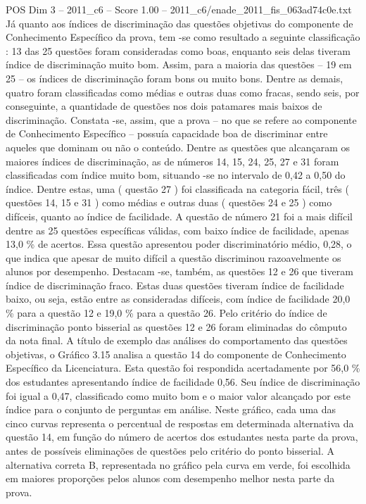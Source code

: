 \begin{textsample}{POS Dim 3 – 2011\_c6 – Score 1.00 – 2011\_c6/enade\_2011\_fis\_063ad74c0e.txt}
Já quanto aos índices de discriminação das questões objetivas do componente de Conhecimento Específico da prova, tem -se como resultado a seguinte classificação : 13 das 25 questões foram consideradas como boas, enquanto seis delas tiveram índice de discriminação muito bom.
Assim, para a maioria das questões – 19 em 25 – os índices de discriminação foram bons ou muito bons.
Dentre as demais, quatro foram classificadas como médias e outras duas como fracas, sendo seis, por conseguinte, a quantidade de questões nos dois patamares mais baixos de discriminação.
Constata -se, assim, que a prova – no que se refere ao componente de Conhecimento Específico – possuía capacidade boa de discriminar entre aqueles que dominam ou não o conteúdo.
Dentre as questões que alcançaram os maiores índices de discriminação, as de números 14, 15, 24, 25, 27 e 31 foram classificadas com índice muito bom, situando -se no intervalo de 0,42 a 0,50 do índice.
Dentre estas, uma ( questão 27 ) foi classificada na categoria fácil, três ( questões 14, 15 e 31 ) como médias e outras duas ( questões 24 e 25 ) como difíceis, quanto ao índice de facilidade.
A questão de número 21 foi a mais difícil dentre as 25 questões específicas válidas, com baixo índice de facilidade, apenas 13,0 \% de acertos.
Essa questão apresentou poder discriminatório médio, 0,28, o que indica que apesar de muito difícil a questão discriminou razoavelmente os alunos por desempenho.
Destacam -se, também, as questões 12 e 26 que tiveram índice de discriminação fraco.
Estas duas questões tiveram índice de facilidade baixo, ou seja, estão entre as consideradas difíceis, com índice de facilidade 20,0 \% para a questão 12 e 19,0 \% para a questão 26.
Pelo critério do índice de discriminação ponto bisserial as questões 12 e 26 foram eliminadas do cômputo da nota final.
A título de exemplo das análises do comportamento das questões objetivas, o Gráfico 3.15 analisa a questão 14 do componente de Conhecimento Específico da Licenciatura.
Esta questão foi respondida acertadamente por 56,0 \% dos estudantes apresentando índice de facilidade 0,56.
Seu índice de discriminação foi igual a 0,47, classificado como muito bom e o maior valor alcançado por este índice para o conjunto de perguntas em análise.
Neste gráfico, cada uma das cinco curvas representa o percentual de respostas em determinada alternativa da questão 14, em função do número de acertos dos estudantes nesta parte da prova, antes de possíveis eliminações de questões pelo critério do ponto bisserial.
A alternativa correta B, representada no gráfico pela curva em verde, foi escolhida em maiores proporções pelos alunos com desempenho melhor nesta parte da prova.

\end{textsample}
